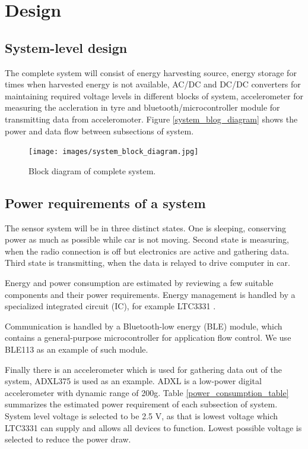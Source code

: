 \section{Design}

\subsection{System-level design}
The complete system will consist of energy harvesting source, energy storage for times when harvested energy is not available, AC/DC and DC/DC converters for maintaining required voltage levels in different blocks of system, accelerometer for measuring the accleration in tyre and bluetooth/microcontroller module for transmitting data from acceleromoter. Figure \ref{system_blog_diagram} shows the power and data flow between subsections of system. 


\begin{figure}[htb]
\begin{center}
\texttt{[image: images/system\_block\_diagram.jpg]}
\end{center}
\caption{\label{system_blog_diagram} Block diagram of complete system.}
\label{liitekuva}
\end{figure}


\subsection{Power requirements of a system}
The sensor system will be in three distinct states. One is sleeping, conserving power as much as possible while car is not moving.
Second state is measuring, when the radio connection is off but electronics are active and gathering data.
Third state is transmitting, when the data is relayed to drive computer in car.

Energy and power consumption are estimated by reviewing a few suitable components and their power requirements. 
Energy management is handled by a specialized integrated circuit (IC), for example LTC3331 \cite{Technology}.

Communication is handled by a Bluetooth-low energy (BLE) module, which contains a general-purpose microcontroller for application flow control.
We use BLE113 \cite{Bluegiga2013} as an example of such module.

Finally there is an accelerometer which is used for gathering data out of the system, ADXL375 \cite{ADXLDatasheet} is used as an example. ADXL is a low-power digital accelerometer with dynamic range of 200g. Table \ref{power_consumption_table}  summarizes the estimated power requirement of each subsection of system. System level voltage is selected to be 2.5 V, as that is lowest voltage which LTC3331 can supply and allows all devices to function. Lowest possible voltage is selected to reduce the power draw.

